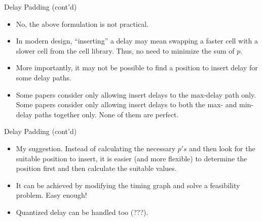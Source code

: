 \documentclass[10pt,ignorenonframetext,mathserif]{beamer}
\providecommand{\tightlist}{%
  \setlength{\itemsep}{0pt}\setlength{\parskip}{0pt}}
\begin{document}
\begin{frame}{Delay Padding (cont'd)}

\begin{itemize}
\tightlist
\item
  No, the above formulation is not practical.
\item
  In modern design, ``inserting'' a delay may mean swapping a faster
  cell with a slower cell from the cell library. Thus, no need to
  minimize the sum of \(p\).
\item
  More importantly, it may not be possible to find a position to insert
  delay for some delay paths.
\item
  Some papers consider only allowing insert delays to the max-delay path
  only. Some papers consider only allowing insert delays to both the
  max- and min-delay paths together only. None of them are perfect.
\end{itemize}

\end{frame}

\begin{frame}{Delay Padding (cont'd)}

\begin{itemize}
\tightlist
\item
  My suggestion. Instead of calculating the necessary \(p's\) and then
  look for the suitable position to insert, it is easier (and more
  flexible) to determine the position first and then calculate the
  suitable values.
\item
  It can be achieved by modifying the timing graph and solve a
  feasibility problem. Easy enough!
\item
  Quantized delay can be handled too (???).
\end{itemize}

\end{frame}
\end{document}
